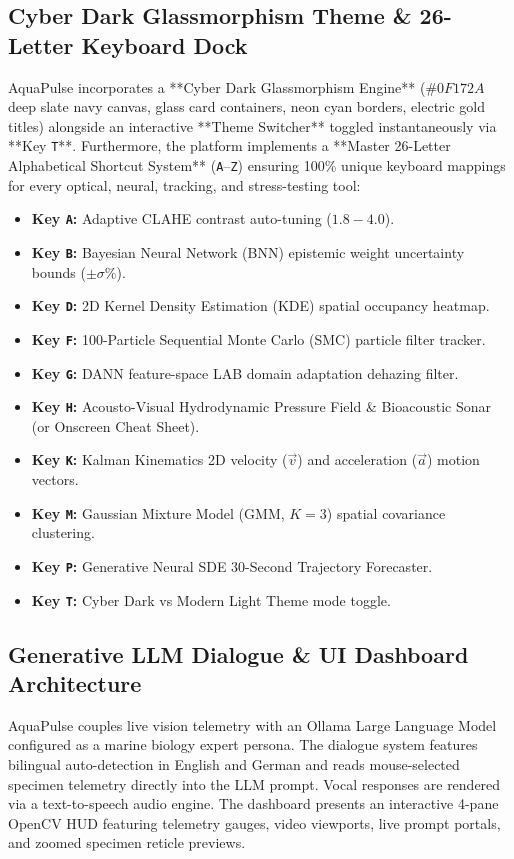 \documentclass[11pt,a4paper]{article}
\newcommand{\citeblue}[1]{\cite{#1}}
\begin{document}
\subsection{Cyber Dark Glassmorphism Theme \& 26-Letter Keyboard Dock}
AquaPulse incorporates a **Cyber Dark Glassmorphism Engine** ($ \#0F172A$ deep slate navy canvas, glass card containers, neon cyan borders, electric gold titles) alongside an interactive **Theme Switcher** toggled instantaneously via **Key \texttt{T}**. Furthermore, the platform implements a **Master 26-Letter Alphabetical Shortcut System** (\texttt{A}--\texttt{Z}) ensuring 100\% unique keyboard mappings for every optical, neural, tracking, and stress-testing tool:
\begin{itemize}
    \item \textbf{Key \texttt{A}:} Adaptive CLAHE contrast auto-tuning ($1.8 - 4.0$).
    \item \textbf{Key \texttt{B}:} Bayesian Neural Network (BNN) epistemic weight uncertainty bounds ($\pm \sigma\%$).
    \item \textbf{Key \texttt{D}:} 2D Kernel Density Estimation (KDE) spatial occupancy heatmap.
    \item \textbf{Key \texttt{F}:} 100-Particle Sequential Monte Carlo (SMC) particle filter tracker.
    \item \textbf{Key \texttt{G}:} DANN feature-space LAB domain adaptation dehazing filter.
    \item \textbf{Key \texttt{H}:} Acousto-Visual Hydrodynamic Pressure Field \& Bioacoustic Sonar (or Onscreen Cheat Sheet).
    \item \textbf{Key \texttt{K}:} Kalman Kinematics 2D velocity ($\vec{v}$) and acceleration ($\vec{a}$) motion vectors.
    \item \textbf{Key \texttt{M}:} Gaussian Mixture Model (GMM, $K=3$) spatial covariance clustering.
    \item \textbf{Key \texttt{P}:} Generative Neural SDE 30-Second Trajectory Forecaster.
    \item \textbf{Key \texttt{T}:} Cyber Dark vs Modern Light Theme mode toggle.
\end{itemize}

\subsection{Generative LLM Dialogue \& UI Dashboard Architecture}
AquaPulse couples live vision telemetry with an Ollama Large Language Model \citeblue{touvron2023llama, dubey2024llama3} configured as a marine biology expert persona. The dialogue system features bilingual auto-detection in English and German and reads mouse-selected specimen telemetry directly into the LLM prompt. Vocal responses are rendered via a text-to-speech audio engine. The dashboard presents an interactive 4-pane OpenCV HUD featuring telemetry gauges, video viewports, live prompt portals, and zoomed specimen reticle previews.
\end{document}
